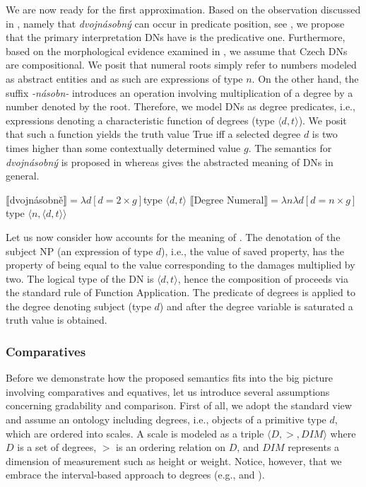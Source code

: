 \documentclass[output=paper,modfonts,hidelinks,newtxmath
\ChapterDOI{10.5281/zenodo.2545513}
]{langscibook}
\begin{document}
We are now ready for the first approximation. Based on the observation discussed in , namely that \textit{dvojnásobný} can occur in predicate position, see , we propose that the primary interpretation DNs have is the predicative one. Furthermore, based on the morphological evidence examined in , we assume that Czech DNs are compositional. We posit that numeral roots simply refer to numbers modeled as abstract entities and as such are expressions of type $n$. On the other hand, the suffix \textit{-násobn-} introduces an operation involving multiplication of a degree by a number denoted by the root. Therefore, we model DNs as degree predicates, i.e., expressions denoting a characteristic function of degrees (type $\langle d,t\rangle$). We posit that such a function yields the truth value True iff a selected degree $d$ is two times higher than some contextually determined value $g$. The semantics for \textit{dvojnásobný} is proposed in  whereas  gives the abstracted meaning of DNs in general.

\ea\label{degree-num-semantics}
\ea $\llbracket$dvojnásobně$\rrbracket = \lambda d[d = 2 \times g]$\hfill{type $\langle d,t\rangle$}\label{degree-num-semantics-dvojnasobne}
\ex $\llbracket$Degree Numeral$\rrbracket = \lambda n\lambda d[d = n \times g]$\hfill{type $\langle n,\langle d,t\rangle\rangle$}\label{degree-num-semantics-abstract}
\z \z

\noindent Let us now consider how  accounts for the meaning of . The denotation of the subject NP (an expression of type $d$), i.e., the value of saved property, has the property of being equal to the value corresponding to the damages multiplied by two. The logical type of the DN is $\langle d,t\rangle$, hence the composition of  proceeds via the standard rule of Function Application. The predicate of degrees is applied to the degree denoting subject (type $d$) and after the degree variable is saturated a truth value is obtained.

\subsubsection{Comparatives}\label{comparatives}

Before we demonstrate how the proposed semantics fits into the big picture involving comparatives and equatives, let us introduce several assumptions concerning gradability and comparison. First of all, we adopt the standard view and assume an ontology including degrees, i.e., objects of a primitive type $d$, which are ordered into scales. A scale is modeled as a triple $\langle D, >, DIM\rangle$ where $D$ is a set of degrees, $>$ is an ordering relation on $D$, and $DIM$ represents a dimension of measurement such as height or weight. Notice, however, that we embrace the interval-based approach to degrees (e.g., \citealt{kennedy2001polar} and \citealt{schwarzschild_wilkinson2002quantifiers}).
\end{document}
